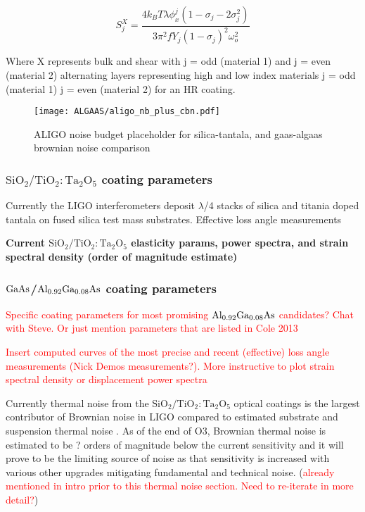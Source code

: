 \begin{equation}
S_j^X = \frac{4k_B T \lambda \phi_x^j(1- \sigma_j - 2 \sigma_j^2)}{3 \pi^2 f Y_j (1-\sigma_j)^2 \omega_o^2}
\end{equation}

Where X represents bulk and shear with j = odd (material 1) and j = even (material 2) alternating layers representing high and low index materials j = odd (material 1) j = even (material 2) for an HR coating.

\begin{figure}[H]
    \begin{center}
    \texttt{[image: ALGAAS/aligo\_nb\_plus\_cbn.pdf]}
    \end{center}
    \caption{ALIGO noise budget placeholder for silica-tantala, and gaas-algaas brownian noise comparison}
\label{fig:aligo_tn_comparison}
\end{figure}

\subsubsection{$\mathrm{SiO_2}/\mathrm{TiO_2:Ta_2O_5}$ coating parameters}
Currently the LIGO interferometers deposit $\lambda$/4 stacks of silica and titania doped tantala on fused silica test mass substrates. Effective loss angle measurements \cite{Harry:06}

\textbf{Current $\mathrm{SiO_2}/\mathrm{TiO_2:Ta_2O_5}$ elasticity params, power spectra, and strain spectral density (order of magnitude estimate)}

\subsubsection{$\mathrm{GaAs}$/$\mathrm{Al_{0.92}Ga_{0.08}As}$ coating parameters}
\textcolor{red}{Specific coating parameters for most promising $\mathrm{Al_{0.92}Ga_{0.08}As}$ candidates? Chat with Steve. Or just mention parameters that are listed in Cole 2013}
\cite{Cole:2013}

\textcolor{red}{Insert computed curves of the most precise and recent (effective) loss angle measurements (Nick Demos measurements?). More instructive to plot strain spectral density or displacement power spectra}

\noindent Currently thermal noise from the $\mathrm{SiO_2}/\mathrm{TiO_2:Ta_2O_5}$ optical coatings is the largest contributor of Brownian noise in LIGO compared to estimated substrate and suspension thermal noise \cite{Harry:06}. As of the end of O3, Brownian thermal noise is estimated to be ? orders of magnitude below the current sensitivity and it will prove to be the limiting source of noise as that sensitivity is increased with various other upgrades mitigating fundamental and technical noise. (\textcolor{red}{already mentioned in intro prior to this thermal noise section. Need to re-iterate in more detail?})
